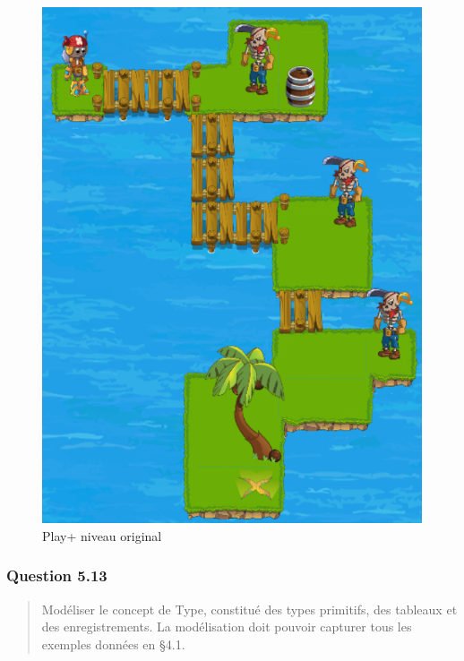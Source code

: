 \documentclass[]{article}
\begin{document}
\begin{figure}
\centering
\includegraphics{./images_final/Play+Q12.png}
\caption{Play+ niveau original}
\end{figure}

\hypertarget{question-5.13}{%
\subsubsection{Question 5.13}\label{question-5.13}}

\begin{quote}
Modéliser le concept de Type, constitué des types primitifs, des
tableaux et des enregistrements. La modélisation doit pouvoir capturer
tous les exemples données en §4.1.
\end{quote}
\end{document}

